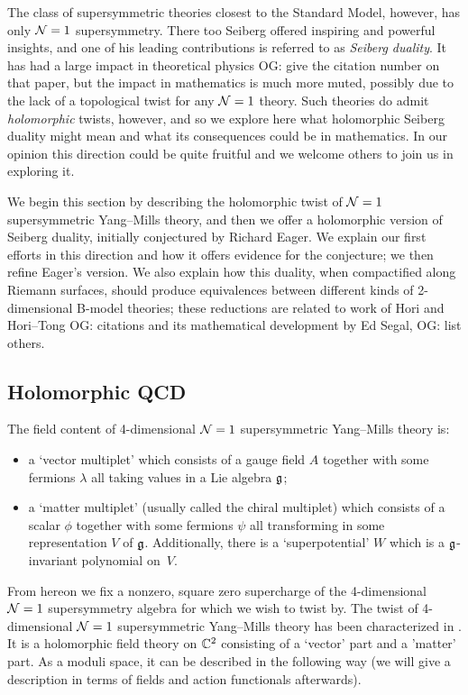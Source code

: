 \documentclass[11pt]{amsart}
\def\owen#1{{\textcolor{violet!65!black}{OG: {#1}}}}
\begin{document}
The class of supersymmetric theories closest to the Standard Model, however, has only $\mathcal N=1$ supersymmetry.
There too Seiberg offered inspiring and powerful insights,
and one of his leading contributions is referred to as {\em Seiberg duality}.
It has had a large impact in theoretical physics \owen{give the citation number on that paper},
but the impact in mathematics is much more muted,
possibly due to the lack of a topological twist for any $\mathcal N=1$ theory.
Such theories do admit {\em holomorphic} twists, however, 
and so we explore here what holomorphic Seiberg duality might mean and what its consequences could be in mathematics.
In our opinion this direction could be quite fruitful and we welcome others to join us in exploring it.

We begin this section by describing the holomorphic twist of $\mathcal N=1$ supersymmetric Yang--Mills theory,
and then we offer a holomorphic version of Seiberg duality, 
initially conjectured by Richard Eager.
We explain our first efforts in this direction and how it offers evidence for the conjecture;
we then refine Eager's version.
We also explain how this duality, when compactified along Riemann surfaces,
should produce equivalences between different kinds of 2-dimensional B-model theories;
these reductions are related to work of Hori and Hori--Tong \owen{citations} and its mathematical development by Ed Segal, \owen{list others}.

\subsection{Holomorphic QCD}

The field content of 4-dimensional $\mathcal N=1$ supersymmetric Yang--Mills theory is:
\begin{itemize}
\item a `vector multiplet' which consists of a gauge field $A$ together with some fermions $\lambda$ all taking values in a Lie algebra $\mathfrak g$;
\item a `matter multiplet' (usually called the chiral multiplet) which consists of a scalar $\phi$ together with some fermions $\psi$ all transforming in some representation $V$ of $\mathfrak g$. 
Additionally, there is a `superpotential' $W$ which is a $\mathfrak g$-invariant polynomial on~$V$. 
\end{itemize}

From hereon we fix a nonzero, square zero supercharge of the 4-dimensional $\mathcal N=1$ supersymmetry algebra for which we wish to twist by. 
The twist of 4-dimensional $\mathcal N=1$ supersymmetric Yang--Mills theory has been characterized in \cite{CosYangian, ESW, SWchar}. 
It is a holomorphic field theory on $\mathbb C^2$ consisting of a `vector' part and a 'matter' part.
As a moduli space, it can be described in the following way (we will give a description in terms of fields and action functionals afterwards).
\end{document}
